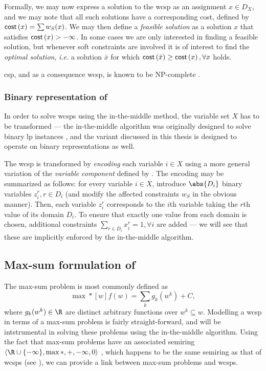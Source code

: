 Formally, we may now express a solution to the \gls{wcsp} as an assignment \({x} \in D_X\), and we may note that all such solutions have a corresponding cost, defined by \(\operatorname{\mathsf{cost}}\left({x}\right) = \sum w_S({x})\).
We may then define a \emph{feasible solution} as a solution \({x}\) that satisfies \(\operatorname{\mathsf{cost}}\left({x}\right) > -\infty\).
In some cases we are only interested in finding a feasible solution, but whenever soft constraints are involved it is of interest to find the \emph{optimal solution}, \emph{i.e.} a solution \(\bar{{x}}\) for which \(\operatorname{\mathsf{cost}}\left(\bar{{x}}\right) \geq \operatorname{\mathsf{cost}}\left({x}\right), \forall {x}\) holds.

\gls{csp}, and as a consequence \gls{wcsp}, is known to be NP-complete \parencite{Mackworth93}.

\subsubsection*{Binary representation of }
\label{term:direct-encoding}
In order to solve \glspl{wcsp} using the in-the-middle method, the variable set \(X\) has to be transformed --- the in-the-middle algorithm was originally designed to solve binary \gls{lp} instances \parencite{Wedelin95}, and the variant discussed in this thesis is designed to operate on binary representations as well.

The \gls{wcsp} is transformed by \emph{encoding} each variable \(i\in X\) using a more general variation of the \emph{variable component} defined by \textcite[\pno~5]{Wedelin08}.
The encoding may be summarized as follows: for every variable \(i\in X\), introduce \(\abs{D_i}\) binary variables \(z_i^r, r\in D_i\) (and modify the affected constraints \(w_S\) in the obvious manner). 
Then, each variable \(z_i^r\) corresponds to the \(i\)th variable taking the \(r\)th value of its domain \(D_i\).
To ensure that exactly one value from each domain is chosen, additional constraints \(\sum_{r\in D_i} x_i^r = 1, \forall i\) are added --- we will see that these are implicitly enforced by the in-the-middle algorithm.

\subsection{Max-sum formulation of }
The max-sum problem is most commonly defined as
\begin{equation}
	\label{eq:max-sum-orig}
	\max*[w] f(w) = \sum_k g_k(w^k) + C,
\end{equation}
where \(g_k(w^k) \in \R\) are distinct arbitrary functions over \(w^k \subseteq w\).
Modelling a \gls{wcsp} in terms of a max-sum problem is fairly straight-forward, and will be intstrumental in solving these problems using the in-the-middle algorithm.
Using the fact that max-sum problems have an associated semiring \(\langle\R\cup\{-\infty\},\max*,+,-\infty,0\rangle\) \parencite[\pno~3]{Werner07}, which happens to be the same semiring as that of \glspl{wcsp} (see ), we can provide a link between max-sum problems and \glspl{wcsp}.

